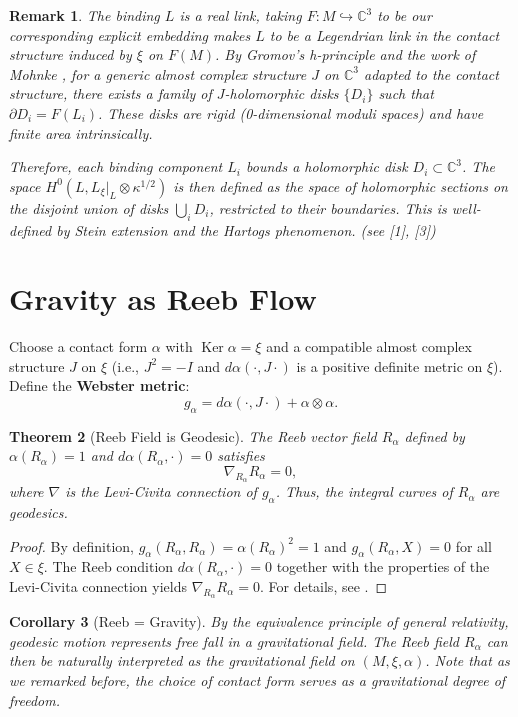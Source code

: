 \documentclass[12pt]{article}
\newtheorem{theorem}{Theorem}[section]
\newtheorem{corollary}[theorem]{Corollary}
\newtheorem{remark}[theorem]{Remark}
\newcommand{\Ker}{\operatorname{Ker}}
\begin{document}
\begin{remark}
The binding $L$ is a real link, taking $F: M \hookrightarrow \mathbb{C}^3$ to be our corresponding explicit embedding makes $L$ to be a Legendrian link in the contact structure induced by $\xi$ on $F(M)$. By Gromov's h-principle \cite{Gromov1985} and the work of Mohnke \cite{Mohnke2001}, for a generic almost complex structure $J$ on $\mathbb{C}^3$ adapted to the contact structure, there exists a family of $J$-holomorphic disks $\{D_i\}$ such that $\partial D_i = F(L_i)$. These disks are rigid (0-dimensional moduli spaces) and have finite area intrinsically.

Therefore, each binding component $L_i$ bounds a holomorphic disk $D_i \subset \mathbb{C}^3$. The space $H^0(L, L_\xi|_L \otimes \kappa^{1/2})$ is then defined as the space of holomorphic sections on the disjoint union of disks $\bigcup_i D_i$, restricted to their boundaries. This is well-defined by Stein extension and the Hartogs phenomenon. (see [1], [3])
\end{remark}

\section{Gravity as Reeb Flow}

Choose a contact form $\alpha$ with $\Ker \alpha = \xi$ and a compatible almost complex structure $J$ on $\xi$ (i.e., $J^2 = -I$ and $d\alpha(\cdot, J\cdot)$ is a positive definite metric on $\xi$). Define the \textbf{Webster metric}:
\[
g_\alpha = d\alpha(\cdot, J\cdot) + \alpha \otimes \alpha.
\]

\begin{theorem}[Reeb Field is Geodesic]
The Reeb vector field $R_\alpha$ defined by $\alpha(R_\alpha)=1$ and $d\alpha(R_\alpha,\cdot)=0$ satisfies
\[
\nabla_{R_\alpha} R_\alpha = 0,
\]
where $\nabla$ is the Levi-Civita connection of $g_\alpha$. Thus, the integral curves of $R_\alpha$ are geodesics.
\end{theorem}

\begin{proof}
By definition, $g_\alpha(R_\alpha, R_\alpha) = \alpha(R_\alpha)^2 = 1$ and $g_\alpha(R_\alpha, X) = 0$ for all $X \in \xi$. The Reeb condition $d\alpha(R_\alpha, \cdot)=0$ together with the properties of the Levi-Civita connection yields $\nabla_{R_\alpha}R_\alpha = 0$. For details, see \cite{LeeSuh2015, DongZhang2018}.
\end{proof}


\begin{corollary}[Reeb = Gravity]
By the equivalence principle of general relativity, geodesic motion represents free fall in a gravitational field. The Reeb field $R_\alpha$ can then be naturally interpreted as the gravitational field on $(M,\xi,\alpha)$. Note that as we remarked before, the choice of contact form serves as a gravitational degree of freedom.
\end{corollary}
\end{document}
